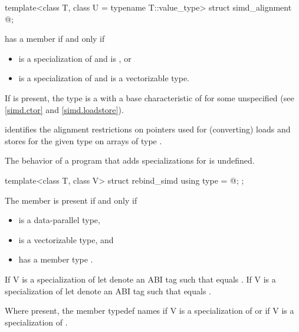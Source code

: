 \begin{itemdecl}
template<class T, class U = typename T::value_type> struct simd_alignment { @\seebelow@ };
\end{itemdecl}

\begin{itemdescr}
\pnum
{} has a member  if and only if
\begin{itemize}
  \item {} is a specialization of  and  is , or
  \item {} is a specialization of  and  is a vectorizable type.
\end{itemize}

\pnum
If  is present, the type  is a  with
a base characteristic of  for some unspecified
 (see \ref{simd.ctor} and \ref{simd.loadstore}). \begin{note} identifies the
alignment restrictions on pointers used for (converting) loads and stores for the given type
 on arrays of type .\end{note}

\pnum
The behavior of a program that adds specializations for  is undefined.
\end{itemdescr}

\begin{itemdecl}
template<class T, class V> struct rebind_simd { using type = @\seebelow@; };
\end{itemdecl}

\begin{itemdescr}
  \pnum
  The member  is present if and only if
  \begin{itemize}
    \item {} is a data-parallel type,
    \item {} is a vectorizable type, and
    \item {} has a member type .
  \end{itemize}

  \pnum
  If \tcode V is a specialization of  let  denote an ABI tag such that
   equals .
  If \tcode V is a specialization of  let  denote an ABI tag such
  that  equals .

  \pnum
  Where present, the member typedef  names  if \tcode V is a
  specialization of  or  if \tcode V is a
  specialization of .
\end{itemdescr}

